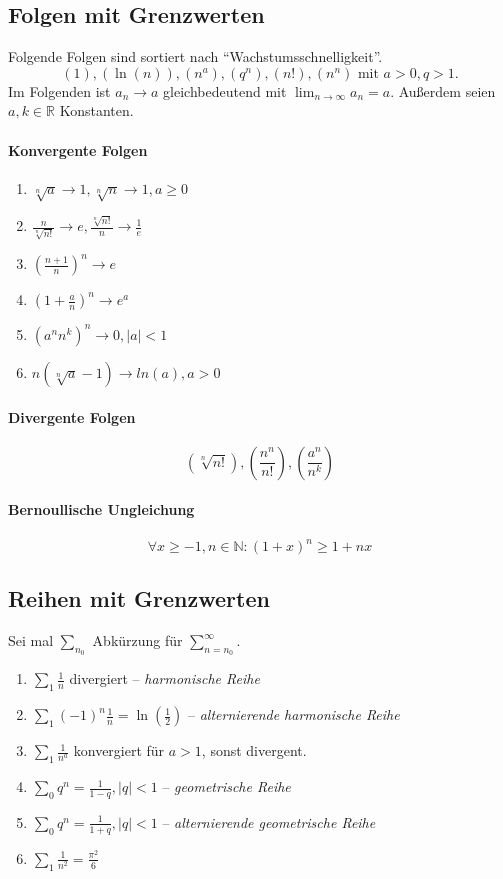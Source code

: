 \documentclass[a4paper, 9pt, DIV=24]{scrartcl}
\newcommand{\N}{\mathbb{N}}
\begin{document}
\subsection{Folgen mit Grenzwerten}
Folgende Folgen sind sortiert nach ``Wachstumsschnelligkeit''.
\[ (1), (\ln(n)), (n^{a}), (q^n), (n!), (n^n) \text{ mit } a > 0, q > 1.\]
Im Folgenden ist $a_n \rightarrow a$ gleichbedeutend mit $\lim_{n\rightarrow\infty} a_n = a$.
Außerdem seien $a,k\in\mathbb{R}$ Konstanten.
\paragraph{Konvergente Folgen}
\begin{enumerate}[label={(}\arabic*{)}]
 \item $\sqrt[n]{a} \rightarrow 1, \sqrt[n]{n} \rightarrow 1, a \geq 0$
 \item $\frac{n}{\sqrt[n]{n!}} \rightarrow e, \frac{\sqrt[n]{n!}}{n} \rightarrow \frac{1}{e}$
 \item $(\frac{n+1}{n})^n \rightarrow e$
 \item $(1 + \frac{a}{n})^n \rightarrow e^a$
 \item $(a^nn^k)^n \rightarrow 0, |a| < 1$
 \item $n(\sqrt[n]{a}-1) \rightarrow ln(a), a > 0$
\end{enumerate}
\paragraph{Divergente Folgen}
\[ (\sqrt[n]{n!}), (\frac{n^n}{n!}), (\frac{a^n}{n^k}) \]
\paragraph{Bernoullische Ungleichung}
\[ \forall x\geq -1, n\in\N: (1+x)^n \geq 1 + nx \]

\subsection{Reihen mit Grenzwerten}
Sei mal $\sum_{n_0}$ Abkürzung für $\sum_{n=n_0}^\infty$.
\begin{enumerate}[label={(}\arabic*{)}]
 \item $\sum_1 \frac{1}{n}$ divergiert -- \emph{harmonische Reihe}
 \item $\sum_1 (-1)^n\frac{1}{n} = \ln(\frac{1}{2})$ -- \emph{alternierende harmonische Reihe}
 \item $\sum_1 \frac{1}{n^a}$ konvergiert für $a > 1$, sonst divergent.
 \item $\sum_0 q^n = \frac{1}{1-q}, |q| < 1$ -- \emph{geometrische Reihe}
 \item $\sum_0 q^n = \frac{1}{1+q}, |q| < 1$ -- \emph{alternierende geometrische Reihe}
 \item $\sum_1 \frac{1}{n^2} = \frac{\pi^2}{6}$
\end{enumerate}
\end{document}
